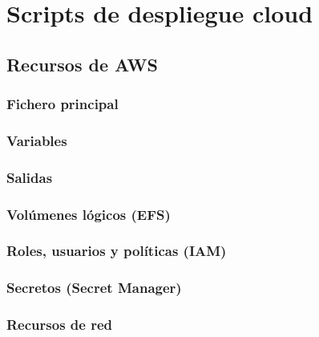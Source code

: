 \chapter{Scripts de despliegue cloud}\label{anexo:cloud}
\section{Recursos de AWS}
\subsection{Fichero principal}

\newpage{}
\subsection{Variables}

\newpage{}
\subsection{Salidas}

\newpage{}
\subsection{Volúmenes lógicos (EFS)}

\newpage{}
\subsection{Roles, usuarios y políticas (IAM)}

\newpage{}
\subsection{Secretos (Secret Manager)}

\newpage{}
\subsection{Recursos de red}

\newpage{}
